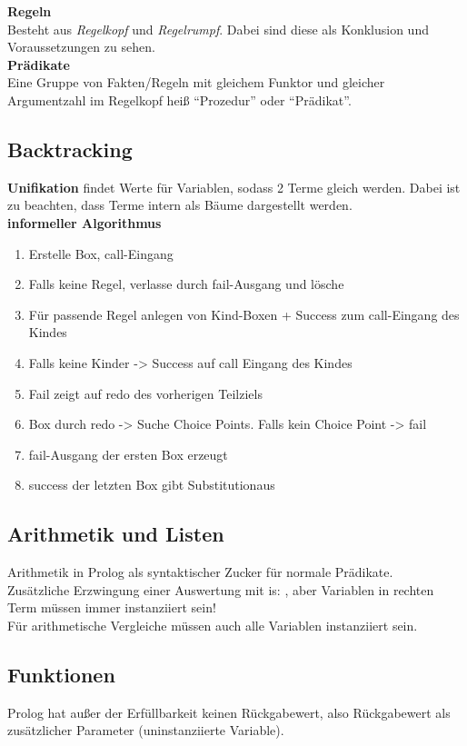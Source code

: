 \textbf{Regeln}\\
Besteht aus \textit{Regelkopf} und \textit{Regelrumpf}. Dabei sind diese als Konklusion und Voraussetzungen zu sehen.
\\

\textbf{Prädikate}\\
Eine Gruppe von Fakten/Regeln mit gleichem Funktor und gleicher Argumentzahl im Regelkopf heiß \enquote{Prozedur}
oder \enquote{Prädikat}.

\newpage
\subsection{Backtracking}%
\label{lp:sub:backtracking}
\textbf{Unifikation} findet Werte für Variablen, sodass 2 Terme gleich werden. Dabei ist zu beachten, dass Terme intern
als Bäume dargestellt werden.\\
\textbf{informeller Algorithmus}
\begin{enumerate}
  \item Erstelle Box, call-Eingang
  \item Falls keine Regel, verlasse durch fail-Ausgang und lösche
  \item Für passende Regel anlegen von Kind-Boxen + Success zum call-Eingang des Kindes
  \item Falls keine Kinder -> Success auf call Eingang des Kindes
  \item Fail zeigt auf redo des vorherigen Teilziels
  \item Box durch redo -> Suche Choice Points. Falls kein Choice Point -> fail
  \item fail-Ausgang der ersten Box erzeugt 
  \item success der letzten Box gibt Substitutionaus
\end{enumerate}

\subsection{Arithmetik und Listen}%
\label{lp:sub:arithmetik-listen}
Arithmetik in Prolog als syntaktischer Zucker für normale Prädikate.\\
Zusätzliche Erzwingung einer Auswertung mit is: , aber Variablen
in rechten Term müssen immer instanziiert sein!\\
Für arithmetische Vergleiche müssen auch alle Variablen instanziiert sein.

\subsection{Funktionen}%
\label{lp:sub:funktionen}
Prolog hat außer der Erfüllbarkeit keinen Rückgabewert, also Rückgabewert als zusätzlicher Parameter (uninstanziierte Variable).

